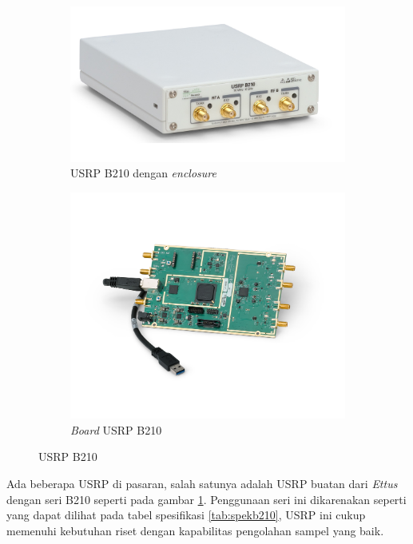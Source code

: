 \begin{center}
	\begin{figure}[h!]
		\begin{subfigure}[b]{0.5\linewidth}
			\includegraphics[width=\linewidth]{pics/bab2/B210.jpg}
			\caption{USRP B210 dengan \textit{enclosure}}
		\end{subfigure}
		\begin{subfigure}[b]{0.5\linewidth}
			\includegraphics[width=\linewidth]{pics/bab2/B210Board.jpg}
			\caption{\textit{Board} USRP B210}
		\end{subfigure}
		\caption{USRP B210}
		\label{pic:gambarusrp}
	\end{figure}
\end{center}

Ada beberapa USRP di pasaran, salah satunya adalah USRP buatan dari \textit{Ettus} dengan seri B210 seperti pada gambar \ref{pic:gambarusrp}. Penggunaan seri ini dikarenakan seperti yang dapat dilihat pada tabel spesifikasi \ref{tab:spekb210}, USRP ini cukup memenuhi kebutuhan riset dengan kapabilitas pengolahan sampel yang baik.

